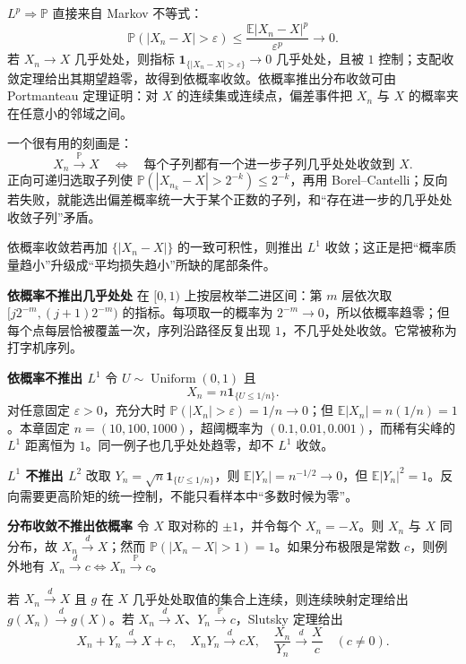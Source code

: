 

$L^p\Rightarrow\mathbb P$ 直接来自 Markov 不等式：
\[
 \mathbb P(|X_n-X|>\varepsilon)
 \le \frac{\mathbb E|X_n-X|^p}{\varepsilon^p}\to0.
\]
若 $X_n\to X$ 几乎处处，则指标
$\mathbf 1_{\{|X_n-X|>\varepsilon\}}\to0$ 几乎处处，且被 $1$ 控制；支配收敛定理给出其期望趋零，故得到依概率收敛。依概率推出分布收敛可由 Portmanteau 定理证明：对 $X$ 的连续集或连续点，偏差事件把 $X_n$ 与 $X$ 的概率夹在任意小的邻域之间。

一个很有用的刻画是：
\[
 X_n\xrightarrow{\mathbb P}X
 \quad\Longleftrightarrow\quad
 \text{每个子列都有一个进一步子列几乎处处收敛到 $X$}.
\]
正向可递归选取子列使
$\mathbb P(|X_{n_k}-X|>2^{-k})\le2^{-k}$，再用 Borel--Cantelli；反向若失败，就能选出偏差概率统一大于某个正数的子列，和“存在进一步的几乎处处收敛子列”矛盾。

依概率收敛若再加 $\{|X_n-X|\}$ 的一致可积性，则推出 $L^1$ 收敛；这正是把“概率质量趋小”升级成“平均损失趋小”所缺的尾部条件。


\noindent\textbf{依概率不推出几乎处处}\quad
在 $[0,1)$ 上按层枚举二进区间：第 $m$ 层依次取
$[j2^{-m},(j+1)2^{-m})$ 的指标。每项取一的概率为 $2^{-m}\to0$，所以依概率趋零；但每个点每层恰被覆盖一次，序列沿路径反复出现 $1$，不几乎处处收敛。它常被称为打字机序列。

\noindent\textbf{依概率不推出 $L^1$}\quad
令 $U\sim\operatorname{Uniform}(0,1)$ 且
\[
 X_n=n\mathbf1_{\{U\le1/n\}}.
\]
对任意固定 $\varepsilon>0$，充分大时
$\mathbb P(|X_n|>\varepsilon)=1/n\to0$；但
$\mathbb E|X_n|=n(1/n)=1$。本章固定 $n=(10,100,1000)$，超阈概率为 $(0.1,0.01,0.001)$，而稀有尖峰的 $L^1$ 距离恒为 $1$。同一例子也几乎处处趋零，却不 $L^1$ 收敛。

\noindent\textbf{$L^1$ 不推出 $L^2$}\quad
改取 $Y_n=\sqrt n\mathbf1_{\{U\le1/n\}}$，则
$\mathbb E|Y_n|=n^{-1/2}\to0$，但
$\mathbb E|Y_n|^2=1$。反向需要更高阶矩的统一控制，不能只看样本中“多数时候为零”。

\noindent\textbf{分布收敛不推出依概率}\quad
令 $X$ 取对称的 $\pm1$，并令每个 $X_n=-X$。则 $X_n$ 与 $X$ 同分布，故 $X_n\xrightarrow dX$；然而
$\mathbb P(|X_n-X|>1)=1$。如果分布极限是常数 $c$，则例外地有
$X_n\xrightarrow dc\Longleftrightarrow X_n\xrightarrow{\mathbb P}c$。


若 $X_n\xrightarrow dX$ 且 $g$ 在 $X$ 几乎处处取值的集合上连续，则连续映射定理给出
$g(X_n)\xrightarrow d g(X)$。若
$X_n\xrightarrow dX$、$Y_n\xrightarrow{\mathbb P}c$，Slutsky 定理给出
\[
 X_n+Y_n\xrightarrow dX+c,
 \quad X_nY_n\xrightarrow dcX,
 \quad \frac{X_n}{Y_n}\xrightarrow d\frac Xc\quad(c\ne0).
\]

